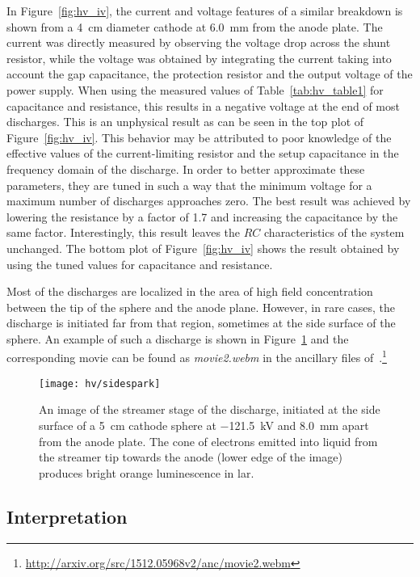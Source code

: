 In Figure~\ref{fig:hv_iv}, the current and voltage features of a similar breakdown is shown from a \SI{4}{\centi\metre} diameter cathode at \SI{6.0}{\milli\metre} from the anode plate.
The current was directly measured by observing the voltage drop across the shunt resistor, while the voltage was obtained by integrating the current taking into account the gap capacitance, the protection resistor and the output voltage of the power supply.
When using the measured values of Table~\ref{tab:hv_table1} for capacitance and resistance, this results in a negative voltage at the end of most discharges.
This is an unphysical result as can be seen in the top plot of Figure~\ref{fig:hv_iv}.
This behavior may be attributed to poor knowledge of the effective values of the current-limiting resistor and the setup capacitance in the frequency domain of the discharge.
In order to better approximate these parameters, they are tuned in such a way that the minimum voltage for a maximum number of discharges approaches zero.
The best result was achieved by lowering the resistance by a factor of 1.7 and increasing the capacitance by the same factor.
Interestingly, this result leaves the $RC$ characteristics of the system unchanged.
The bottom plot of Figure~\ref{fig:hv_iv} shows the result obtained by using the tuned values for capacitance and resistance.

Most of the discharges are localized in the area of high field concentration between the tip of the sphere and the anode plane.
However, in rare cases, the discharge is initiated far from that region, sometimes at the side surface of the sphere.
An example of such a discharge is shown in Figure~\ref{fig:hv_side} and the corresponding movie can be found as \emph{movie2.webm} in the ancillary files of~\cite{breakdown_16}.\footnote{\url{http://arxiv.org/src/1512.05968v2/anc/movie2.webm}}

\begin{figure}[htb]
	\centering	
	\texttt{[image: hv/sidespark]}
	\caption[ test streamer image]{%
		An image of the streamer stage of the discharge, initiated at the side surface of a \SI{5}{\centi\metre} cathode sphere at \SI{-121.5}{\kilo\volt} and \SI{8.0}{\milli\metre} apart from the anode plate.
		The cone of electrons emitted into liquid from the streamer tip towards the anode (lower edge of the image) produces bright orange luminescence in \acrshort{lar}.
	}
	\label{fig:hv_side}
\end{figure}


\subsection{Interpretation}
\label{sec:studies_hv_interpretation}

